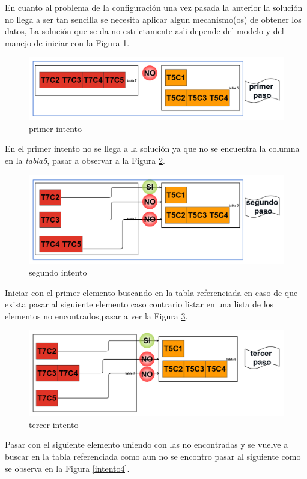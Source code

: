 En cuanto al problema de la configuraci\'on una vez pasada la anterior la soluci\'on no llega a ser tan sencilla se necesita aplicar algun mecanismo(os) de obtener los datos, La soluci\'on que se da no estrictamente as'i depende del modelo y del manejo de iniciar con la Figura \ref{intento1}.
\begin{figure}[H]
\centering
\includegraphics[scale=0.35]{images/paso1.png}
\caption{primer intento}\label{intento1}
\end{figure}
En el primer intento no se llega a la soluci\'on ya que no se encuentra la columna en la \textit{tabla5}, pasar a observar a la Figura \ref{intento2}.
\begin{figure}[H]
\centering
\includegraphics[scale=0.35]{images/paso2.png}
\caption{segundo intento}\label{intento2}
\end{figure}
Iniciar con el primer elemento buscando en la tabla referenciada en caso de que exista pasar al siguiente elemento caso contrario listar en una lista de los elementos no encontrados,pasar a ver la Figura \ref{intento3}. 
\begin{figure}[H]
\centering
\includegraphics[scale=0.35]{images/paso3.png}
\caption{tercer intento}\label{intento3}
\end{figure}
Pasar con el siguiente elemento uniendo con las no encontradas y se vuelve a buscar en la tabla referenciada como aun no se encontro pasar al siguiente como se observa en la Figura \ref{intento4}.
